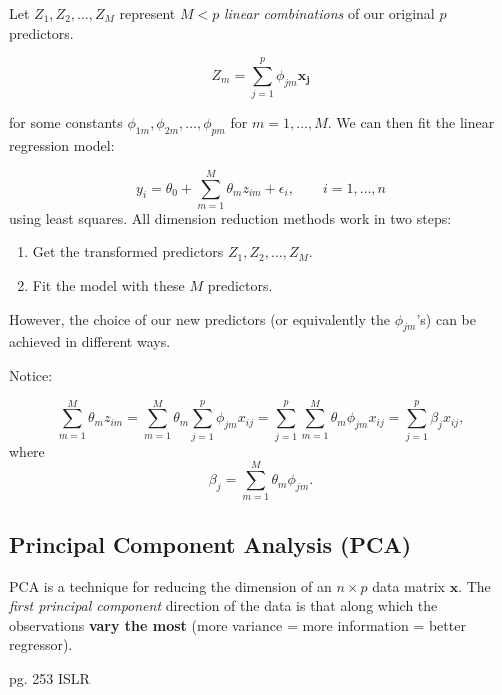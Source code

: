 \documentclass[11pt]{article}
\begin{document}
\begin{definition}
    Let $Z_1, Z_2, \ldots, Z_M$ represent $M<p$ \textit{linear combinations} of our original $p$ predictors. 

    \begin{equation*}
        Z_m = \sum_{j=1}^p \phi_{jm}\mathbf{x_j}
    \end{equation*}

    for some constants $\phi_{1m}, \phi_{2m}, \ldots, \phi_{pm}$ for $m= 1, \ldots, M$. We can then fit the linear regression model:

    \begin{equation}
        \label{dim reduction lin reg}
        y_i = \theta_0 + \sum_{m=1}^M \theta_m z_{im} + \epsilon_i, \qquad i = 1, \ldots, n
    \end{equation}
    using least squares. All dimension reduction methods work in two steps:

    \begin{enumerate}
        \item Get the transformed predictors $Z_1, Z_2, \ldots, Z_M$.
        \item Fit the model with these $M$ predictors. 
    \end{enumerate}
    However, the choice of our new predictors (or equivalently the $\phi_{jm}$'s) can be achieved in different ways.
\end{definition}

\begin{note}
    Notice:

    \begin{equation*}
        \sum_{m=1}^M \theta_m z_{im} = \sum_{m=1}^M \theta_m \sum_{j=1}^p \phi_{jm}x_{ij} = \sum_{j=1}^p \sum_{m=1}^M \theta_m \phi_{jm} x_{ij} = \sum_{j=1}^p \beta_j x_{ij},
    \end{equation*}
    where
    \begin{equation*}
        \beta_j = \sum_{m=1}^M \theta_m \phi_{jm}.
    \end{equation*}
\end{note}

\subsection{Principal Component Analysis (PCA)}

PCA is a technique for reducing the dimension of an $n \times p$ data matrix $\mathbf{x}$. The \textit{first principal component} direction of the data is that along which the observations \textbf{vary the most} (more variance = more information = better regressor).

pg. 253 ISLR
\end{document}

